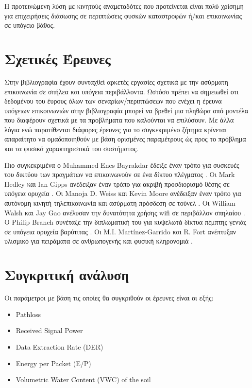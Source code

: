 \documentclass[12pt]{article}
\begin{document}
\begin{multicols*}{2}
        Η προτεινώμενη λύση με κινητούς αναμεταδότες που προτείνεται είναι πολύ χρίσημη
        για επιχειρήσεις διάσωσης σε περιπτώσεις φυσκών καταστροφών ή/και επικοινωνίας σε
        υπόγειο βάθος.

    \section{\normalsize \textsf{Σχετικές Έρευνες}} Στην βιβλιογραφία έχουν συνταχθεί
        αρκετές εργασίες σχετικά με την ασύρματη επικοινωνία σε σπήλεα και υπόγεια
        περιβάλλοντα. Ωστόσο πρέπει να σημειωθεί οτι δεδομένου του έυρους όλων των 
        σεναρίων/περιπτώσεων που ενέχει η έρευνα υπόγειων επικοινωνιών στην βιβλιογραφία
        μπορεί να βρεθεί μια πληθώρα από μοντέλα που διαφέρουν σχετικά με τα προβλήματα που
        καλούνται να επιλύσουν. Με άλλα λόγια ενώ παρατίθενται διάφορες έρευνες για το 
        συγκεκριμένο ζήτημα κρίνεται απαραίτητο να ομαδοποιηθούν με βάση ορισμένες παραμέτρους
        ώς προς το πρόβλημα και τα φυσικά χαρακτηριστικά του συστήματος.
        
        Πιο συγκεκριμένα ο Muhammed Enes Bayrakdar έδειξε έναν τρόπο για
        συσκευές του δικτύου των πραγμάτων να επικοινωνούν σε ένα δίκτυο πλέγματος
        \cite{bayrakdar_rule_2019}. Οι Mark Hedley και Ian Gipps ανέδειξαν έναν τρόπο για
        ακριβή προσδιορισμό θέσης σε υπόγεια ορυχεία \cite{hedley_accurate_2013}. Οι
        Manoja D. Weiss και Kevin Moore ανέδειξαν έναν τρόπο για αυτόνομη κινητή
        τηλεπικοινωνία και ασύρματη πρόσδεση σε τούνελ \cite{weiss_autonomous_2009}. Οι
        William Walsh και Jay Gao ανέλυσαν την δυνατότητα χρήσης wifi σε περιβάλλον
        σπηλαίου \cite{walsh_communications_2018}. Ο Philip Branch συνέταξε την
        διπλωματική του για κυψελωτά δίκτυα πέμπτης γενιάς σε υπόγεια ορυχεία βαρύτιτας
        \cite{branch_fifth_2021}. Οι M.I. Martínez-Garrido και R. Fort ανέπτυξαν υλισμικό
        για πειράματα σε ανθρωπογενής και φυσική κληρονομιά
        \cite{martinez-garrido_experimental_2016}.

    \section{\normalsize \textsf{Συγκριτική ανάλυση}}
        Οι παράμετροι με βάση τις οποίες θα συγκριθούν οι έρευνες είναι οι εξής:
            \begin{itemize}
                \item Pathloss
                \item Received Signal Power
                \item Data Extraction Rate (DER)
                \item Energy per Packet (E/P)
                \item Volumetric Water Content (VWC) of the soil
            \end{itemize}


\end{multicols*}
\end{document}
